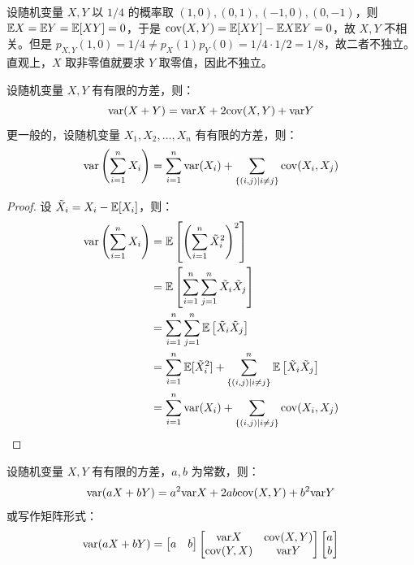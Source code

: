 \begin{example}[不相关且不独立]
设随机变量 $X,Y$ 以 $1/4$ 的概率取 $(1,0),(0,1),(-1,0),(0,-1)$，则 $\mathbb{E} X=\mathbb{E} Y=\mathbb{E}[XY]=0$，于是 $\mathrm{cov}(X,Y)=\mathbb{E}[XY]-\mathbb{E} X\mathbb{E} Y=0$，故 $X,Y$ 不相关。但是 $p_{X,Y}(1,0)=1/4\neq p_X(1)p_Y(0)=1/4\cdot 1/2=1/8$，故二者不独立。直观上，$X$ 取非零值就要求 $Y$ 取零值，因此不独立。
\end{example}

\begin{theorem}[随机变量和的方差]
设随机变量 $X,Y$ 有有限的方差，则：
\[\mathrm{var}(X+Y)=\mathrm{var} X+2\mathrm{cov}(X,Y)+\mathrm{var} Y\]
更一般的，设随机变量 $X_1,X_2,\ldots,X_n$ 有有限的方差，则：
\[
\mathrm{var}\left(\sum_{i=1}^n X_i\right)=\sum_{i=1}^n\mathrm{var}(X_i)+\sum_{\{(i,j)\mid i\neq j\}}\mathrm{cov}(X_i,X_j)
\]
\end{theorem}
\begin{proof}
设 $\tilde X_i=X_i-\mathbb{E}[X_i]$，则：
\begin{align*}
\mathrm{var}\left(\sum_{i=1}^n X_i\right)&=\mathbb{E}\left[\left(\sum_{i=1}^n{\tilde X_i}^2\right)^2\right]\\
&=\mathbb{E}\left[\sum_{i=1}^n\sum_{j=1}^n\tilde X_i\tilde X_j\right]\\
&=\sum_{i=1}^n\sum_{j=1}^n\mathbb{E}\left[\tilde X_i\tilde X_j\right]\\
&=\sum_{i=1}^n\mathbb{E}[{\tilde X_i}^2]+\sum_{\{(i,j)\mid i\neq j\}}^n\mathbb{E}\left[\tilde X_i\tilde X_j\right]\\
&=\sum_{i=1}^n\mathrm{var}(X_i)+\sum_{\{(i,j)\mid i\neq j\}}\mathrm{cov}(X_i,X_j)
\end{align*}
\end{proof}

\begin{corollary}
设随机变量 $X,Y$ 有有限的方差，$a,b$ 为常数，则：
\[
\mathrm{var}(aX+bY)=a^2\mathrm{var} X+2ab\mathrm{cov}(X,Y)+b^2\mathrm{var} Y
\]
或写作矩阵形式：
\[
\mathrm{var}(aX+bY)=\begin{bmatrix}a&b\end{bmatrix}\begin{bmatrix}\mathrm{var} X&\mathrm{cov}(X,Y)\\\mathrm{cov}(Y,X)&\mathrm{var} Y\end{bmatrix}\begin{bmatrix}a\\b\end{bmatrix}
\]
\end{corollary}


